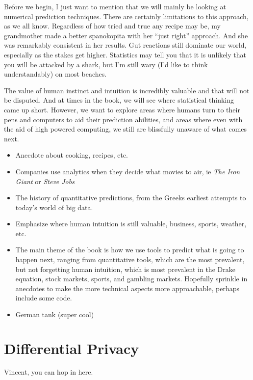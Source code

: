 \documentclass[12pt,twoside]{book}
\begin{document}
 Before we begin, I just want to mention that we will mainly be looking at numerical prediction techniques.  There are certainly limitations to this approach, as we all know.  Regardless of how tried and true  any recipe may be, my grandmother made a better spanokopita with her ``just right'' approach.  And she was remarkably consistent in her results.  Gut reactions still dominate our world, especially as the stakes get higher.  Statistics may tell you that it is unlikely that you will be attacked by a shark, but I'm still wary (I'd like to think understandably) on most beaches.  
 
 The value of human instinct and intuition is incredibly valuable and that will not be disputed. And at times in the book, we will see where statistical thinking came up short.   However, we want to explore areas where humans turn to their pens and computers to aid their prediction abilities, and areas where even with the aid of high powered computing, we still are blissfully unaware of what comes next.

	\begin{itemize}
		\item Anecdote about cooking, recipes, etc.
		\item Companies use analytics when they decide what movies to air, ie \emph{The Iron Giant} or \emph{Steve Jobs}
		\item The history of quantitative predictions, from the Greeks earliest attempts to today's world of big data.
		\item Emphasize where human intuition is still valuable, business, sports, weather, etc. 
		\item The main theme of the book is how we use tools to predict what is going to happen next, ranging from quantitative tools, which are the most prevalent, but not forgetting human intuition, which is most prevalent in the Drake equation, stock markets, sports, and gambling markets. Hopefully sprinkle in anecdotes to make the more technical aspects more approachable, perhaps include some code.
		\item German tank (super cool)
	\end{itemize}
	\chapter{Differential Privacy}
		\begin{savequote}[45mm]
		Vincent, you can hop in here.
	\end{savequote}
\end{document}

